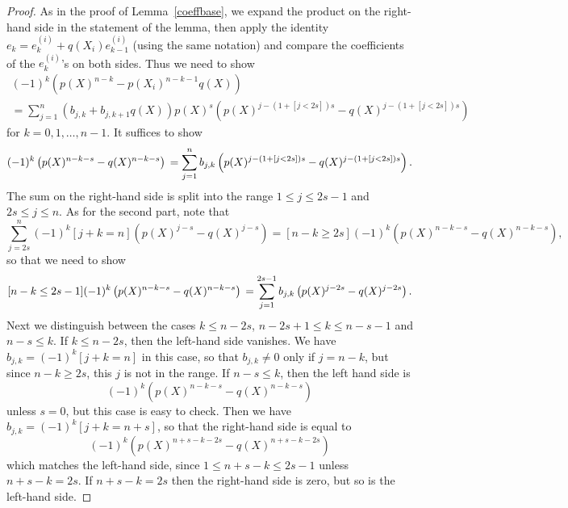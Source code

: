 \documentclass[12pt,dvipsnames]{amsart}
\theoremstyle{definition}
\begin{document}
\begin{proof}
As in the proof of Lemma~\ref{coeffbase}, we expand the product on the right-hand side in the statement of the lemma, then apply 
the identity $e_k=e_k^{(i)}+q(X_i) e_{k-1}^{(i)}$ (using the same notation) and compare the coefficients of 
the $e^{(i)}_k$'s on both sides. Thus we need to show 
\begin{multline*} 
(-1)^{k} \left(p(X)^{n-k}-p(X_i)^{n-k-1} q(X) \right) \\
=
\sum_{j=1}^n (b_{j,k}+b_{j,k+1}q(X)) p(X)^{s} \left( p(X)^{j-(1+[j<2s])s}-q(X)^{j-(1+[j<2s])s} \right)
\end{multline*} 
for $k=0,1,\ldots,n-1$. It suffices to show 
$$ 
(-1)^{k} \left(p(X)^{n-k-s}-q(X)^{n-k-s} \right) \\
=
\sum_{j=1}^n b_{j,k} \left( p(X)^{j-(1+[j<2s])s}-q(X)^{j-(1+[j<2s])s} \right).
$$
The sum on the right-hand side is split into the range $1 \le j \le 2s-1$ and $2s \le j \le n$. 
As for the second part, note that 
$$
\sum_{j=2s}^n (-1)^k [j+k=n] \left( p(X)^{j-s}-q(X)^{j-s} \right)
= [n-k \ge 2s] (-1)^k \left( p(X)^{n-k-s}-q(X)^{n-k-s} \right),
$$
so that we need to show 
$$ 
[n-k \le 2s-1] (-1)^{k} \left(p(X)^{n-k-s}-q(X)^{n-k-s} \right) \\
=
\sum_{j=1}^{2s-1} b_{j,k} \left( p(X)^{j-2s}-q(X)^{j-2s} \right).
$$
Next we distinguish between the cases $k \le n-2s$, $n-2s+1 \le k \le n-s-1$ and $n-s \le k$.
If $k \le n-2s$, then the left-hand side vanishes. We have $b_{j,k}=(-1)^k [j+k=n]$ in this case, so that 
$b_{j,k} \not= 0$ only if $j=n-k$, but since $n-k \ge 2s$, this $j$ is not in the range. If 
$n-s \le k$, then the left hand side is 
$$
(-1)^{k} \left(p(X)^{n-k-s}-q(X)^{n-k-s} \right) 
$$ 
unless $s=0$, but this case is easy to check. Then we have $b_{j,k}=(-1)^k [j+k=n+s]$, so that the 
right-hand side is equal to 
$$
(-1)^k \left( p(X)^{n+s-k-2s}-q(X)^{n+s-k-2s} \right)
$$
which matches the left-hand side, 
since $1 \le n+s-k \le 2s-1$ unless $n+s-k=2s$. If $n+s-k=2s$ then the right-hand side is zero, but so is the left-hand side.


\end{proof}
\end{document}
